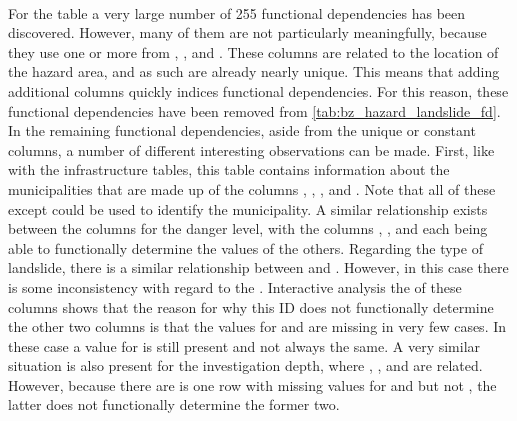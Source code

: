 \paragraph{}
For the table  a very large number of 255 functional dependencies has been discovered. However, many of them are not particularly meaningfully, because they use one or more from , , and . These columns are related to the location of the hazard area, and as such are already nearly unique. This means that adding additional columns quickly indices functional dependencies. For this reason, these functional dependencies have been removed from \cref{tab:bz_hazard_landslide_fd}.
In the remaining functional dependencies, aside from the unique or constant columns, a number of different interesting observations can be made. 
First, like with the infrastructure tables, this table contains information about the municipalities that are made up of the columns , , , and . Note that all of these except  could be used to identify the municipality.
A similar relationship exists between the columns for the danger level, with the columns , , and  each being able to functionally determine the values of the others.
Regarding the type of landslide, there is a similar relationship between  and . However, in this case there is some inconsistency with regard to the . Interactive analysis the of these columns shows that the reason for why this ID does not functionally determine the other two columns is that the values for  and  are missing in very few cases. In these case a value for  is still present and not always the same.
A very similar situation is also present for the investigation depth, where , , and  are related. However, because there are is one row with missing values for  and  but not , the latter does not functionally determine the former two.


